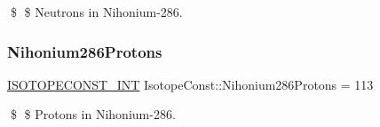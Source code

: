 \$ \$ Neutrons in Nihonium-\/286. \mbox{\label{group___isotope_const-_nihonium-_nh286_ga66933140166638545d1d9145b22dfb3d}} 
\subsubsection{\texorpdfstring{Nihonium286\+Protons}{Nihonium286Protons}}
{\footnotesize\ttfamily \mbox{\hyperlink{group___isotope_const-_macros_ga5f18360b3e99483a35c32d789e62621c}{I\+S\+O\+T\+O\+P\+E\+C\+O\+N\+S\+T\+\_\+\+I\+NT}} Isotope\+Const\+::\+Nihonium286\+Protons = 113}

\$ \$ Protons in Nihonium-\/286. 